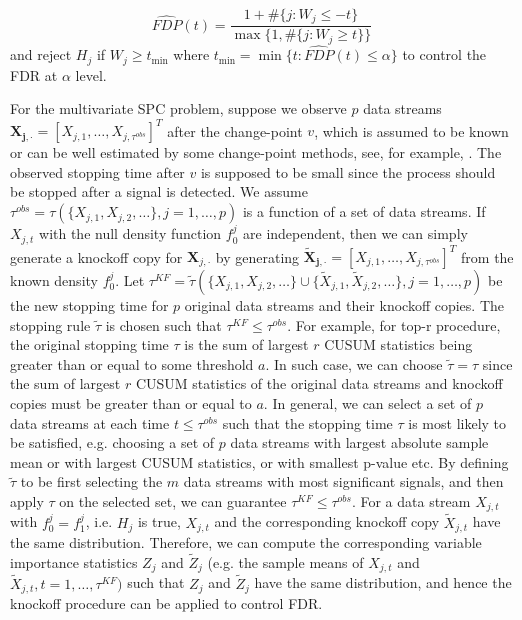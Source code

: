 \documentclass[a4paper,12pt]{article}
\begin{document}
\begin{equation}\label{eq1}
\widehat{FDP}(t) = \frac{1 + \# \{j: W_j \le -t\}}{\max \{1, \#\{j: W_j \ge t\}\}}
\end{equation}
and reject $H_j$ if $W_j \ge t_{\min}$ where $t_{\min} =\min \{t: \widehat{FDP}(t)  \le \alpha\}$ to control the FDR at $\alpha$ level.

For the multivariate SPC problem, suppose we observe $p$ data streams $\bm{X_{j,\cdot}} = [X_{j,1}, \ldots, X_{j,\tau^{obs}}]^T$ after the change-point $v$, which is assumed to be known or can be well estimated by some change-point methods, see, for example, \cite{zamba2006multivariate}. The observed stopping time after $v$ is supposed to be small since the process should be stopped after a signal is detected. We assume $\tau^{obs} = \tau \left( \{X_{j,1}, X_{j,2}, \ldots\}, j=1, \ldots, p \right)$ is a function of a set of data streams. If $X_{j,t}$ with the null density function $f_0^j$ are independent, then we can simply generate a knockoff copy for $\bm X_{j,\cdot}$ by generating $\bm{\tilde X_{j,\cdot}} = [X_{j,1}, \ldots, X_{j,\tau^{obs}}]^T$ from the known density $f_0^j$. Let $\tau^{KF}=\tilde \tau (\{ X_{j,1}, X_{j,2}, \ldots\} \cup \{ \tilde X_{j,1},\tilde X_{j,2},\ldots\}, j=1, \ldots, p)$ be the new stopping time for $p$ original data streams and their knockoff copies. The stopping rule $\tilde \tau$ is chosen such that $\tau^{KF} \le \tau^{obs}$. For example, for top-r procedure, the original stopping time $\tau$ is the sum of largest $r$ CUSUM statistics being greater than or equal to some threshold $a$. In such case, we can choose $\tilde\tau=\tau$ since the sum of largest $r$ CUSUM statistics of the original data streams and knockoff copies must be greater than or equal to $a$. In general, we can select a set of $p$ data streams at each time $t \le \tau^{obs}$ such that the stopping time $\tau$ is most likely to be satisfied, e.g. choosing a set of $p$ data streams with largest absolute sample mean or with largest CUSUM statistics, or with smallest p-value etc. By defining $\tilde \tau$ to be first selecting the $m$ data streams with most significant signals, and then apply $\tau$ on the selected set, we can guarantee $\tau^{KF} \le \tau^{obs}$. For a data stream $X_{j,t}$ with $f_0^j = f_1^j$, i.e. $H_j$ is true, $X_{j,t}$ and the corresponding knockoff copy $\tilde X_{j,t}$ have the same distribution. Therefore, we can compute the corresponding variable importance statistics $Z_j$ and $\tilde Z_j$ (e.g. the sample means of $X_{j,t}$ and $\tilde X_{j,t}, t=1, \ldots, \tau^{KF})$ such that $Z_j$ and $\tilde Z_j$ have the same distribution, and hence the knockoff procedure can be applied to control FDR.
\end{document}
